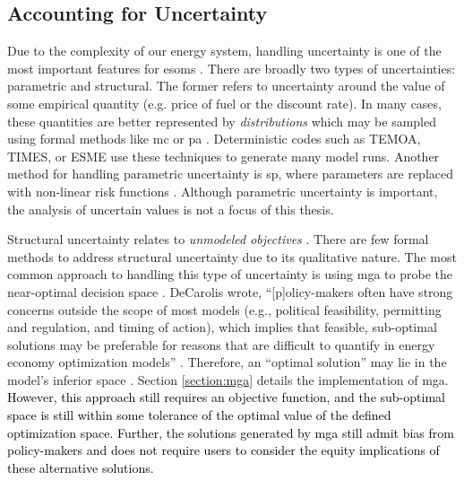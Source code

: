 \subsection{Accounting for Uncertainty}
\label{section:uncertainty}
Due to the complexity of our energy system, handling uncertainty is one of the
most important features for \acp{esom} \cite{yue_review_2018,
decarolis_using_2011}. There are broadly two types of uncertainties: parametric
and structural. The former refers to uncertainty around the value of some
empirical quantity (e.g. price of fuel or the discount rate). In many cases,
these quantities are better represented by \textit{distributions} which may be
sampled using formal methods like \ac{mc} or \ac{pa}
\cite{pfenninger_energy_2014, yue_review_2018}. Deterministic codes such as
TEMOA, TIMES, or ESME use these techniques to generate many model runs. Another
method for handling parametric uncertainty is \ac{sp}, where parameters are
replaced with non-linear risk functions \cite{yue_review_2018,
decarolis_multi-stage_2012}. Although parametric uncertainty is important, the
analysis of uncertain values is not a focus of this thesis.

Structural uncertainty relates to \textit{unmodeled objectives}
\cite{yue_review_2018, decarolis_using_2011, decarolis_modelling_2016}. There
are few formal methods to address structural uncertainty due to its qualitative
nature. The most common approach to handling this type of uncertainty is using
\ac{mga} to probe the near-optimal decision space \cite{brill_mga_1990,
jenkins_genx_2022, decarolis_using_2011, neumann_near-optimal_2021,
pfenninger_energy_2014}. DeCarolis wrote, ``[p]olicy-makers often have strong
concerns outside the scope of most models (e.g., political feasibility,
permitting and regulation, and timing of action), which implies that feasible,
sub-optimal solutions may be preferable for reasons that are difficult to
quantify in energy economy optimization models'' \cite{decarolis_using_2011}.
Therefore, an ``optimal solution'' may lie in the model's inferior space
\cite{decarolis_using_2011}. Section \ref{section:mga} details the
implementation of \ac{mga}. \textcolor{black}{However, this approach still
requires an objective function, and the sub-optimal space is still within some
tolerance of the optimal value of the defined optimization space. Further, the
solutions generated by \ac{mga} still admit bias from policy-makers and does not
require users to consider the equity implications of these alternative
solutions.} 

